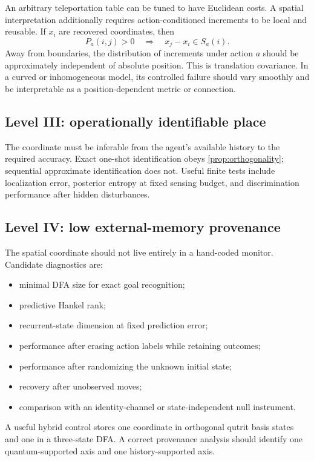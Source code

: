 \documentclass[11pt]{article}
\theoremstyle{definition}
\theoremstyle{remark}
\begin{document}
An arbitrary teleportation table can be tuned to have Euclidean costs. A
spatial interpretation additionally requires action-conditioned increments
to be local and reusable. If $x_i$ are recovered coordinates, then
\begin{equation}
 P_a(i,j)>0
 \quad\Longrightarrow\quad
 x_j-x_i\in S_a(i).
 \label{eq:increment-law}
\end{equation}
Away from boundaries, the distribution of increments under action $a$ should
be approximately independent of absolute position. This is translation
covariance. In a curved or inhomogeneous model, its controlled failure should
vary smoothly and be interpretable as a position-dependent metric or
connection.

\subsection{Level III: operationally identifiable place}

The coordinate must be inferable from the agent's available history to the
required accuracy. Exact one-shot identification obeys
\cref{prop:orthogonality}; sequential approximate identification does not.
Useful finite tests include localization error, posterior entropy at fixed
sensing budget, and discrimination performance after hidden disturbances.

\subsection{Level IV: low external-memory provenance}

The spatial coordinate should not live entirely in a hand-coded monitor.
Candidate diagnostics are:
\begin{itemize}
 \item minimal DFA size for exact goal recognition;
 \item predictive Hankel rank;
 \item recurrent-state dimension at fixed prediction error;
 \item performance after erasing action labels while retaining outcomes;
 \item performance after randomizing the unknown initial state;
 \item recovery after unobserved moves;
 \item comparison with an identity-channel or state-independent null
 instrument.
\end{itemize}
A useful hybrid control stores one coordinate in orthogonal qutrit basis
states and one in a three-state DFA. A correct provenance analysis should
identify one quantum-supported axis and one history-supported axis.
\end{document}
